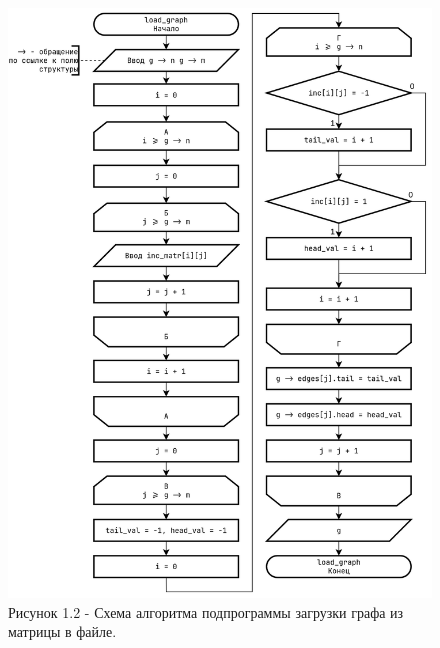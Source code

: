 \documentclass[oneside,a4paper,14pt]{extarticle}
\begin{document}
\clearpage
\begin{figure}[H]
	\centering
	\includegraphics[height=0.9\textheight]{pics/flowchart2.png}
	\caption*{Рисунок 1.2 - Схема алгоритма подпрограммы загрузки графа из матрицы в файле.}
\end{figure}
\end{document}
